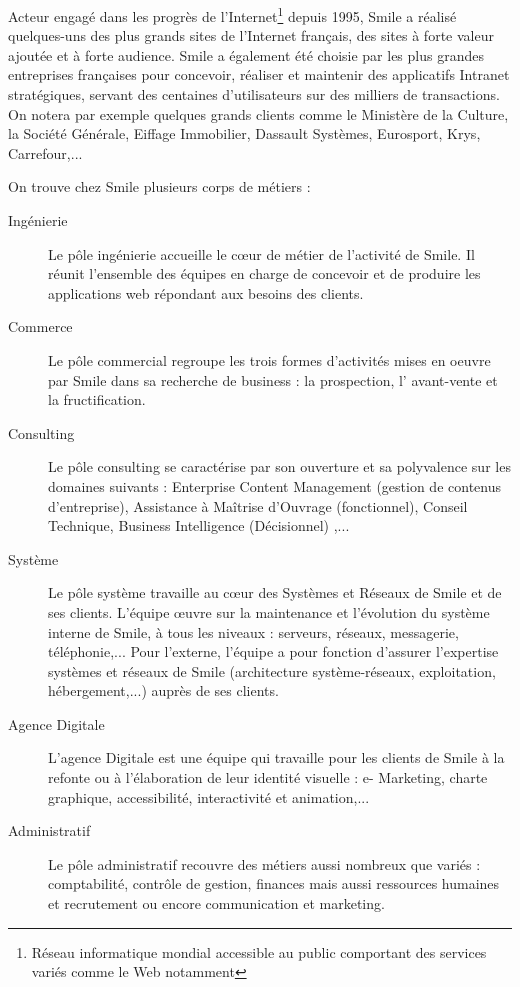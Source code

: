\documentclass[a4paper,11pt,twoside]{report}
\begin{document}
  Acteur engagé dans les progrès de l’Internet\footnote{Réseau informatique mondial accessible au public comportant des services variés comme le Web notamment} depuis 1995, Smile a réalisé quelques-uns des plus grands sites de l'Internet français, des sites à forte valeur ajoutée et à forte audience. Smile a également été choisie par les plus grandes entreprises françaises pour concevoir, réaliser et maintenir des applicatifs Intranet stratégiques, servant des centaines d'utilisateurs sur des milliers de transactions. On notera par exemple quelques grands clients comme le Ministère de la Culture, la Société Générale, Eiffage Immobilier, Dassault Systèmes, Eurosport, Krys, Carrefour,...\newline
  
  On trouve chez Smile plusieurs corps de métiers :\newline
  \begin{description}

    \item[Ingénierie] Le pôle ingénierie accueille le cœur de métier de l’activité de Smile. Il réunit l’ensemble des équipes en charge de concevoir et de produire les applications web répondant aux besoins des clients.
    \item[Commerce] Le pôle commercial regroupe les trois formes d’activités mises en oeuvre par Smile dans sa recherche de business : la prospection, l’ avant-vente et la fructification.
    \item[Consulting] Le pôle consulting se caractérise par son ouverture et sa polyvalence sur les domaines suivants : Enterprise Content Management (gestion de contenus d’entreprise), Assistance à Maîtrise d’Ouvrage (fonctionnel), Conseil Technique, Business Intelligence (Décisionnel) ,...
    \item[Système] Le pôle système travaille au cœur des Systèmes et Réseaux de Smile et de ses clients. L’équipe œuvre sur la maintenance et l’évolution du système interne de Smile, à tous les niveaux : serveurs, réseaux, messagerie, téléphonie,... Pour l’externe, l’équipe a pour fonction d’assurer l’expertise systèmes et réseaux de Smile (architecture système-réseaux, exploitation, hébergement,...) auprès de ses clients.
    \item[Agence Digitale] L'agence Digitale est une équipe qui travaille pour les clients de Smile à la refonte ou à l’élaboration de leur identité visuelle : e- Marketing, charte graphique, accessibilité, interactivité et animation,... 
    \item[Administratif] Le pôle administratif recouvre des métiers aussi nombreux que variés : comptabilité, contrôle de gestion, finances mais aussi ressources humaines et recrutement ou encore communication et marketing.
    \newline
    
  \end{description}
  
\end{document}
